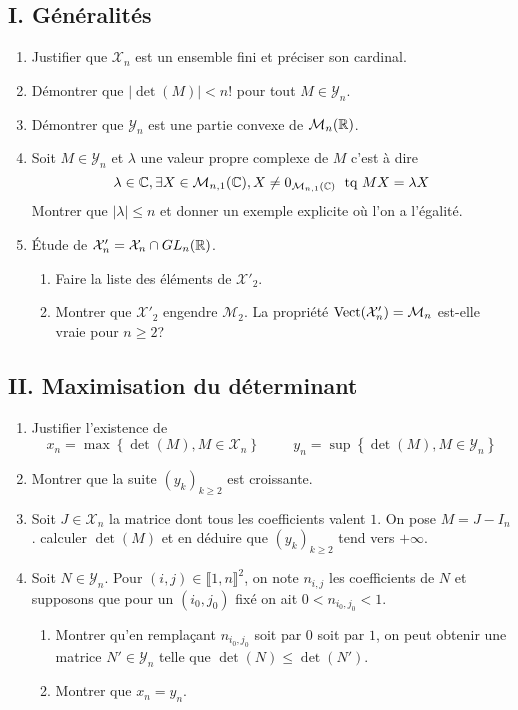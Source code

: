 \subsection*{I. Généralités}
\begin{enumerate}
  \item Justifier que $\mathcal{X}_n$ est un ensemble fini et préciser son cardinal.
  \item Démontrer que $|\det(M)| < n!$ pour tout $M\in \mathcal{Y}_n$.
  \item Démontrer que $\mathcal{Y}_n$ est une partie convexe de $\mathcal{M}_n(\mathbb{R})$.
  \item Soit $M\in \mathcal{Y}_n$ et $\lambda$ une valeur propre complexe de $M$ c'est à dire
\begin{displaymath}
\lambda \in \mathbb{C}, \exists X\in \mathcal{M}_{n,1}(\mathbb{C}), X\neq 0_{\mathcal{M}_{n,1}(\mathbb{C})}\; \text{ tq } MX = \lambda X  
\end{displaymath}
Montrer que $|\lambda|\leq n$ et donner un exemple explicite où l'on a l'égalité.
  \item \'Etude de $\mathcal{X}'_n = \mathcal{X}_n \cap GL_n(\mathbb{R})$.
\begin{enumerate}
  \item Faire la liste des éléments de $\mathcal{X}'_2$.
  \item Montrer que $\mathcal{X}'_2$ engendre $\mathcal{M}_2$. La propriété $\operatorname{Vect}(\mathcal{X}'_n) = \mathcal{M}_n$ est-elle vraie pour $n\geq 2$? 
\end{enumerate}
\end{enumerate}

\subsection*{II. Maximisation du déterminant}
\begin{enumerate}
  \item Justifier l'existence de
\begin{displaymath}
  x_n = \max\left\lbrace \det(M), M\in \mathcal{X}_n\right\rbrace 
  \hspace{1cm}
  y_n = \sup\left\lbrace \det(M), M\in \mathcal{Y}_n\right\rbrace
\end{displaymath}
  \item Montrer que la suite $\left( y_k\right)_{k\geq 2}$ est croissante.
  \item Soit $J\in \mathcal{X}_n$ la matrice dont tous les coefficients valent $1$. On pose $M = J -I_n$. calculer $\det(M)$ et en déduire que $\left( y_k\right)_{k\geq 2}$ tend vers $+\infty$.
  \item Soit $N\in \mathcal{Y}_n$. Pour $(i,j)\in \llbracket 1,n \rrbracket ^2$, on note $n_{i,j}$ les coefficients de $N$ et supposons que pour un $(i_0,j_0)$ fixé on ait $0 < n_{i_0, j_0} < 1$.
  \begin{enumerate}
    \item Montrer qu'en remplaçant $n_{i_0, j_0}$ soit par $0$ soit par $1$, on peut obtenir une matrice $N'\in \mathcal{Y}_n$ telle que $\det(N) \leq \det(N')$.
    \item Montrer que $x_n = y_n$.
  \end{enumerate}
\end{enumerate}

